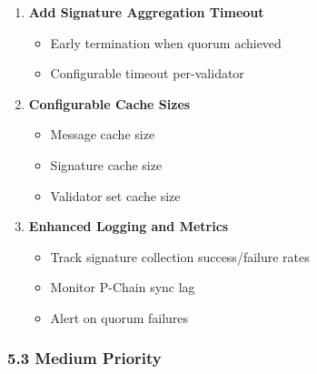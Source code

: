 \documentclass[
]{article}
\providecommand{\tightlist}{%
  \setlength{\itemsep}{0pt}\setlength{\parskip}{0pt}}
\begin{document}
\begin{enumerate}
\def\labelenumi{\arabic{enumi}.}
\setcounter{enumi}{3}
\item
  \textbf{Add Signature Aggregation Timeout}

  \begin{itemize}
  \tightlist
  \item
    Early termination when quorum achieved
  \item
    Configurable timeout per-validator
  \end{itemize}
\item
  \textbf{Configurable Cache Sizes}

  \begin{itemize}
  \tightlist
  \item
    Message cache size
  \item
    Signature cache size
  \item
    Validator set cache size
  \end{itemize}
\item
  \textbf{Enhanced Logging and Metrics}

  \begin{itemize}
  \tightlist
  \item
    Track signature collection success/failure rates
  \item
    Monitor P-Chain sync lag
  \item
    Alert on quorum failures
  \end{itemize}
\end{enumerate}

\subsubsection{5.3 Medium Priority}\label{53-medium-priority}
\end{document}
